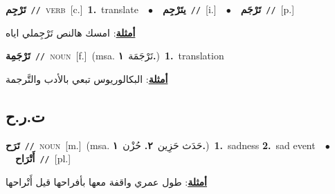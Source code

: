 \documentclass[10pt,a4paper,twoside]{article} %
\begin{document}
\begin{multicols}{2}
{{{{{\setlength\topsep{0pt}\textbf{\foreignlanguage{arabic}{تَرْجِم}}\ {\color{gray}\texttt{//}\color{black}}\ \textsc{verb}\ [c.]\ \textbf{1.}~translate\ \ $\bullet$\ \ \setlength\topsep{0pt}\textbf{\foreignlanguage{arabic}{يتَرْجِم}}\ {\color{gray}\texttt{//}\color{black}}\ [i.]\ \ $\bullet$\ \ \setlength\topsep{0pt}\textbf{\foreignlanguage{arabic}{تَرْجَم}}\ {\color{gray}\texttt{//}\color{black}}\ [p.]\  \begin{flushright}\color{gray}\foreignlanguage{arabic}{\textbf{\underline{\foreignlanguage{arabic}{أمثلة}}}: امسك هالنص تَرْجِملي اياه}\end{flushright}\color{black}} \vspace{2mm}

{\setlength\topsep{0pt}\textbf{\foreignlanguage{arabic}{تَرْجَمِة}}\ {\color{gray}\texttt{//}\color{black}}\ \textsc{noun}\ [f.]\ \color{gray}(msa. \foreignlanguage{arabic}{تَرْجَمَة}~\foreignlanguage{arabic}{\textbf{١.}})\color{black}\ \textbf{1.}~translation\  \begin{flushright}\color{gray}\foreignlanguage{arabic}{\textbf{\underline{\foreignlanguage{arabic}{أمثلة}}}: البكالوريوس تبعي بالأدب والتَّرجمة}\end{flushright}\color{black}} \vspace{2mm}

\vspace{-3mm}
\subsection*{\color{blue}\foreignlanguage{arabic}{ت.ر.ح}\color{blue}{}} 

{\setlength\topsep{0pt}\textbf{\foreignlanguage{arabic}{تَرَح}}\ {\color{gray}\texttt{//}\color{black}}\ \textsc{noun}\ [m.]\ \color{gray}(msa. \foreignlanguage{arabic}{حَدَث حَزِين}~\foreignlanguage{arabic}{\textbf{٢.}}  \foreignlanguage{arabic}{حُزْن}~\foreignlanguage{arabic}{\textbf{١.}})\color{black}\ \textbf{1.}~sadness  \textbf{2.}~sad event\ \ $\bullet$\ \ \setlength\topsep{0pt}\textbf{\foreignlanguage{arabic}{أَتْرَاح}}\ {\color{gray}\texttt{//}\color{black}}\ [pl.]\  \begin{flushright}\color{gray}\foreignlanguage{arabic}{\textbf{\underline{\foreignlanguage{arabic}{أمثلة}}}: طول عمري واقفة معها بأفراحها قيل أَتْراحها}\end{flushright}\color{black}} \vspace{2mm}

}}}}
\end{multicols}
\end{document}
